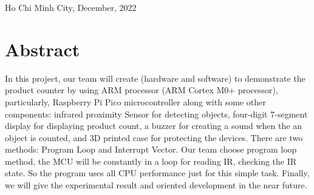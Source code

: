 \documentclass[a4paper,twoside]{report}
\begin{document}
\begin{titlepage}
\begin{otherlanguage}{vietnamese}
\end{otherlanguage}

\vspace{1.5cm}
\begin{center}
{\fontsize{13pt}{1}\selectfont Ho Chi Minh City,  December, 2022}
\end{center}
\end{titlepage}

\cleardoublepage
\setcounter{page}{1}

\tableofcontents

\chapter{Abstract}
In this project, our team will create (hardware and software) to demonstrate the product counter by using ARM processor (ARM Cortex M0+ processor), particularly, Raspberry Pi Pico microcontroller along with some other components: infrared proximity Sensor for detecting objects, four-digit 7-segment display for displaying product count, a buzzer for creating a sound when the an object is counted, and 3D printed case for protecting the devices. There are two methods: Program Loop and Interrupt Vector. Our team choose program loop method, the MCU will be constantly in a loop for reading IR, checking the IR state. So the program uses all CPU performance just for this simple task. Finally, we will give the experimental result and oriented development in the near future.
\end{document}
